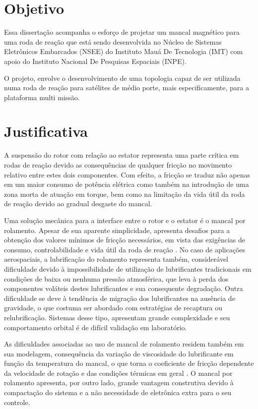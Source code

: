 \section{Objetivo}

Essa dissertação acompanha o esforço de projetar um mancal magnético para uma roda de reação que está sendo desenvolvida no Núcleo de Sistemas Eletrônicos Embarcados (NSEE) do Instituto Mauá De Tecnologia (IMT) com apoio do Instituto Nacional De Pesquisas Espaciais (INPE).

O projeto, envolve o desenvolvimento de uma topologia capaz de ser utilizada numa roda de reação para satélites de médio porte, mais especificamente, para a plataforma multi missão.


\section{Justificativa}

A suspensão do rotor com relação ao estator representa uma parte crítica em rodas de reação \citep{taniwaki2003experimental} devido as consequências de qualquer fricção no movimento relativo entre estes dois componentes. Com efeito, a fricção se traduz não apenas em um maior consumo de potência elétrica como também na introdução de uma zona morta de atuação em torque, bem como na limitação da vida útil da roda de reação devido ao gradual desgaste do mancal.

Uma solução mecânica para a interface entre o rotor e o estator é o mancal por rolamento. Apesar de sua aparente simplicidade, apresenta desafios para a obtenção dos valores mínimos de fricção necessários, em vista das exigências de consumo, controlabilidade e vida útil da roda de reação \citep{Krishnan2010}. No caso de aplicações aerospaciais, a lubrificação do rolamento representa também, considerável dificuldade devido à impossibilidade de utilização de lubrificantes tradicionais em condições de baixa ou nenhuma pressão atmosférica, que leva à perda dos componentes voláteis destes lubrificantes e sua consequente degradação. Outra dificuldade se deve à tendência de migração dos lubrificantes na ausência de gravidade, o que costuma ser abordado com estratégias de recaptura ou relubrificação. Sistemas desse tipo, apresentam grande complexidade e seu comportamento orbital é de difícil validação em laboratório.

As dificuldades associadas ao uso de mancal de rolamento residem também em sua modelagem, consequência da variação de viscosidade do lubrificante em função da temperatura do mancal, o que torna o coeficiente de fricção dependente da velocidade de rotação e das condições térmicas em geral \citep{Carrara2007}. O mancal por rolamento apresenta, por outro lado, grande vantagem construtiva devido à compactação do sistema e a não necessidade de eletrônica extra para o seu controle. 

